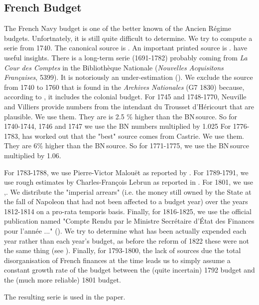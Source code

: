 \documentclass[12pt,a4paper,notitlepage,english]{article}
\begin{document}
\begin{appendix}
\subsection{French Budget} \label{french_budget}

The French Navy budget is one of the better known of the Ancien Régime budgets. Unfortnately, it is still quite difficult to determine. We try to compute a serie from 1740.
The canonical source is \cite{Legoherel1965}.
An important printed source is \cite{Neuville1898}. \cite{Dull1975, Villiers2002} have useful insights.
There is a long-term serie (1691-1782) probably coming from \textit{La Cour des Comptes} in the Bibliothèque Nationale (\textit{Nouvelles Acquisitons Françaises}, 5399).
It is notoriously an under-estimation (\cite{Villiers2002}).
We exclude the source from 1740 to 1760 that is found in the \textit{Archives Nationales} (G7 1830) because, according to \cite{Villiers2002}, it includes the colonial budget.
For 1745 and 1748-1770, Neuville and Villiers provide numbers from the intendant du Trousset d’Héricourt that are plausible.
We use them.
They are is 2.5 \% higher than the BN source.
So for 1740-1744, 1746 and 1747 we use the BN numbers multiplied by 1.025
For 1776-1783, \cite{Dull1975, p.348-350} has worked out that the "best" source comes from Castrie.
We use them.
They are 6\% higher than the BN source.
So for 1771-1775, we use the BN source multiplied by 1.06.

For 1783-1788, we use Pierre-Victor Malouët as reported by \cite{Villiers2002}. For 1789-1791, we use rough estimates by Charles-François Lebrun as reported in \cite{Marion1914, p. 259 and 332}. For 1801, we use \cite{Branda2007},. We distribute the "imperial arrears" (i.e. the money still owned by the State at the fall of Napoleon that had not been affected to a budget year) over the years 1812-1814 on a pro-rata temporis basis.
Finally, for 1816-1825, we use the official publication named "Compte Rendu par le Ministre Secrétaire d’État des Finances pour l’année ..." (\cite{1817,1818,1819... }).
We try to determine what has been actually expended each year rather than each year’s budget, as before the reform of 1822 these were not the same thing (see \cite{Kott2019}).
Finally, for 1793-1800, the lack of sources due the total disorganisation of French finances at the time leads us to simply assume a constant growth rate of the budget between the (quite incertain) 1792 budget and the (much more reliable) 1801 budget.

The resulting serie is used in the paper.






\end{appendix}

\tableofcontents

\listoftodos[Notes]
\end{document}
